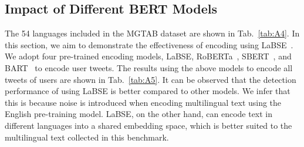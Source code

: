 \documentclass[10pt,twocolumn,letterpaper]{article}
\begin{document}
\begin{table*}[htbp]
\centering
\caption{The performance of using different features on MGTAB. Best results are highlighted in \textbf{bold}.}
\vspace{0.2cm}
\label{tab:A3}
\end{table*}



\subsection{Impact of Different BERT Models}
\label{sec:BERTModels}
The 54 languages included in the MGTAB dataset are shown in Tab.~\ref{tab:A4}. In this section, we aim to demonstrate the effectiveness of encoding using LaBSE~\cite{Alpher54}. We adopt four pre-trained encoding models, LaBSE, RoBERTa~\cite{Alpher62}, SBERT~\cite{Alpher63}, and BART~\cite{Alpher64} to encode user tweets. The results using the above models to encode all tweets of users are shown in Tab.~\ref{tab:A5}. It can be observed that the detection performance of using LaBSE is better compared to other models. We infer that this is because noise is introduced when encoding multilingual text using the English pre-training model. LaBSE, on the other hand, can encode text in different languages into a shared embedding space, which is better suited to the multilingual text collected in this benchmark.
\end{document}
